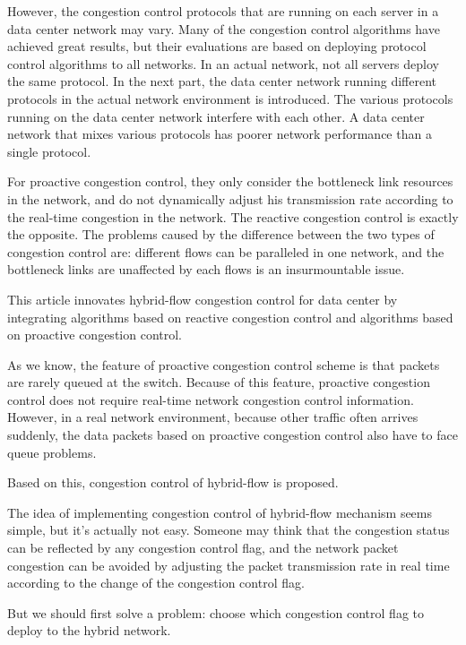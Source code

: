\documentclass[conference]{IEEEtran}
\begin{document}
\indent However, the congestion control protocols that are running on each server in a data center network may vary. Many of the congestion control algorithms have achieved great results, but their evaluations are based on deploying protocol control algorithms to all networks. In an actual network, not all servers deploy the same protocol. In the next part, the data center network running different protocols in the actual network environment is introduced. The various protocols running on the data center network interfere with each other. A data center network that mixes various protocols has poorer network performance than a single protocol.

\indent For proactive congestion control, they only consider the bottleneck link resources in the network, and do not dynamically adjust his transmission rate according to the real-time congestion in the network\cite{perry2015fastpass}\cite{gao2015phost}\cite{cho2017credit}. The reactive congestion control is exactly the opposite.  The problems caused by the difference between the two types of congestion control are: different flows can be paralleled in one network, and the bottleneck links are unaffected by each flows is an insurmountable issue.

\indent This article innovates hybrid-flow congestion control for data center by integrating algorithms based on reactive congestion control and algorithms based on proactive congestion control.

\indent As we know, the feature of proactive congestion control scheme is that packets are rarely queued at the switch. Because of this feature, proactive congestion control does not require real-time network congestion control information. However, in a real network environment, because other traffic often arrives suddenly, the data packets based on proactive congestion control also have to face queue problems.

\indent Based on this, congestion control of hybrid-flow is proposed.

\indent The idea of implementing congestion control of hybrid-flow mechanism seems simple, but it's actually not easy. Someone may think that the congestion status can be reflected by any congestion control flag, and the network packet congestion can be avoided by adjusting the packet transmission rate in real time according to the change of the congestion control flag.

\indent But we should first solve a problem: choose which congestion control flag to deploy to the hybrid network.
\end{document}

